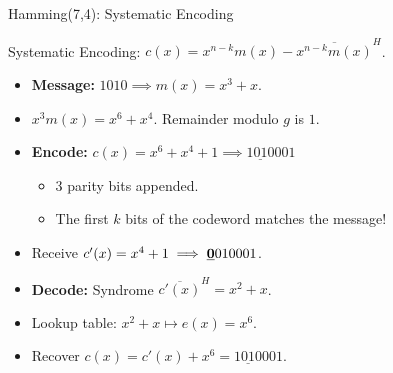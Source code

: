 \documentclass[handout]{beamer}
\begin{document}
\begin{frame}{Hamming(7,4): Systematic Encoding}

    Systematic Encoding: $c(x) = x^{n-k}m(x) - \overline{x^{n-k}m(x)}^H$.
    \begin{itemize}
        \item \textbf{Message:} $1010 \implies m(x) = x^3+x$.
        \item $x^3m(x) = x^6+x^4$. Remainder modulo $g$ is $1$.
        \item \textbf{Encode:} $c(x) = x^6+x^4+1 \implies \underline{1010}001$
        \begin{itemize}
            \item 3 parity bits appended.
            \item The first $k$ bits of the codeword matches the message!
        \end{itemize}
        \item Receive $c'(x)=x^4+1 \implies \underline{\textbf 0}010001$.
        \item \textbf{Decode:} Syndrome $\overline{c'(x)}^H = x^2+x$.
        \item Lookup table: $x^2 + x \mapsto e(x)=x^6$.
        \item Recover $c(x)=c'(x)+x^6=\underline{1010}001$.
    \end{itemize}
\end{frame}

\end{document}
